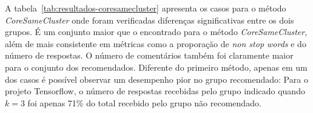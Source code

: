 \documentclass[12pt,openany,oneside,a4paper,english,brazil]{abntbibufjf}
\begin{document}
A tabela~\ref{tab:resultados-coresamecluster} apresenta os casos para o método \textit{CoreSameCluster} onde foram verificadas diferenças significativas entre os dois grupos. É um conjunto maior que o encontrado para o método \textit{CoreSameCluster}, além de mais consistente em métricas como a proporação de \textit{non stop words} e do número de respostas. O número de comentários também foi claramente maior para o conjunto dos recomendados. Diferente do primeiro método, apenas em um dos casos é possível observar um desempenho pior no grupo recomendado: Para o projeto Tensorflow, o número de respostas recebidas pelo grupo indicado quando $k = 3$ foi apenas 71\% do total recebido pelo grupo não recomendado.

\begin{table}[htbp]
\centering
{}
\end{table}
\end{document}
